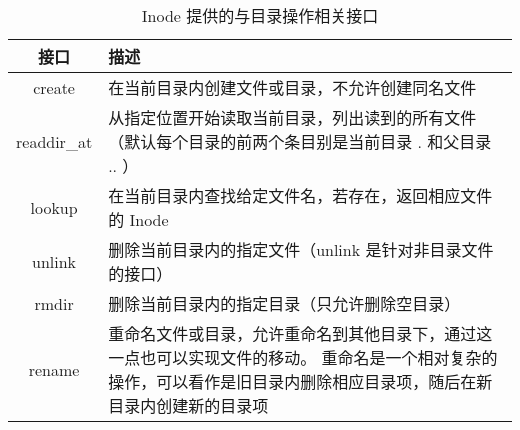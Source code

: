 \begin{table}[h]
    \centering
    \begin{tabularx}{\textwidth}{|c|Y|}
    \hline
    接口 & 描述 \\
    \hline
    create & 在当前目录内创建文件或目录，不允许创建同名文件\\
    \hline
    readdir\_at & 从指定位置开始读取当前目录，列出读到的所有文件
    （默认每个目录的前两个条目别是当前目录 . 和父目录 .. ）\\
    \hline
    lookup & 在当前目录内查找给定文件名，若存在，返回相应文件的 Inode\\
    \hline
    unlink & 删除当前目录内的指定文件（unlink 是针对非目录文件的接口）\\
    \hline
    rmdir & 删除当前目录内的指定目录（只允许删除空目录）\\
    \hline
    rename & 重命名文件或目录，允许重命名到其他目录下，通过这一点也可以实现文件的移动。
    重命名是一个相对复杂的操作，可以看作是旧目录内删除相应目录项，随后在新目录内创建新的目录项\\
    \hline
    \end{tabularx}
    \caption{Inode 提供的与目录操作相关接口}
    \label{tab:dir}
\end{table}
